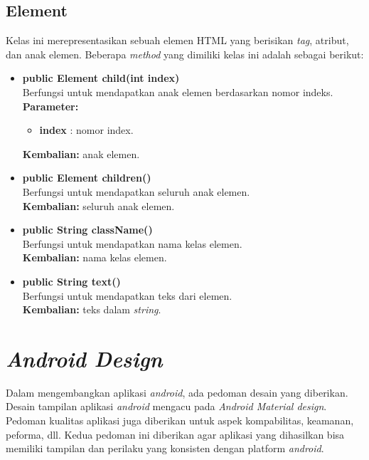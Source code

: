 \subsection{Element}

Kelas ini merepresentasikan sebuah elemen HTML yang berisikan \textit{tag}, atribut, dan anak elemen. Beberapa \textit{method} yang dimiliki kelas ini adalah sebagai berikut:
\begin{itemize}
	\item \textbf{public Element child(int index)} \\
		Berfungsi untuk mendapatkan anak elemen berdasarkan nomor indeks. \\
		\textbf{Parameter:} 
		\begin{itemize}
			\item \textbf{index} : nomor index.
		\end{itemize}
		\textbf{Kembalian:} anak elemen.	
		
		\item \textbf{public Element children()} \\
		Berfungsi untuk mendapatkan seluruh anak elemen. \\
		\textbf{Kembalian:} seluruh anak elemen.	
		
		\item \textbf{public String className()} \\
		Berfungsi untuk mendapatkan nama kelas elemen. \\
		\textbf{Kembalian:} nama kelas elemen.	
		
		\item \textbf{public String text()} \\
		Berfungsi untuk mendapatkan teks dari elemen. \\
		\textbf{Kembalian:} teks dalam \textit{string}.	
\end{itemize}


\section{\textit{Android Design}}
\label{sec:android design}
Dalam mengembangkan aplikasi \textit{android}, ada pedoman desain yang diberikan. Desain tampilan aplikasi \textit{android} mengacu pada \textit{Android Material design}. Pedoman kualitas aplikasi juga diberikan untuk aspek kompabilitas, keamanan, peforma, dll. Kedua pedoman ini diberikan agar aplikasi yang dihasilkan bisa memiliki tampilan dan perilaku yang konsisten dengan platform \textit{android}. 
 
